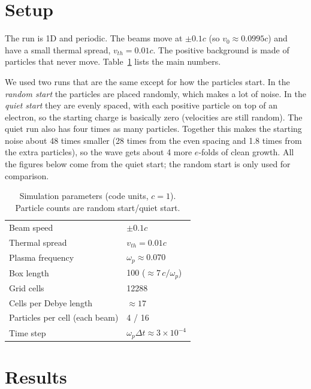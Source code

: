 \documentclass[10pt,twocolumn,letterpaper]{article}
\newcommand{\wpe}{\omega_{p}}   %
\newcommand{\vz}{v_0}           %
\begin{document}
\section{Setup}

The run is 1D and periodic. The beams move at $\pm0.1c$ (so $\vz\approx0.0995c$) and have a small
thermal spread, $v_{th}=0.01c$. The positive background is made of particles that never move.
Table~\ref{tab:params} lists the main numbers.

We used two runs that are the same except for how the particles start. In the \emph{random
start} the particles are placed randomly, which makes a lot of noise. In the \emph{quiet start}
they are evenly spaced, with each positive particle on top of an electron, so the starting charge
is basically zero (velocities are still random). The quiet run also has four times as many
particles. Together this makes the starting noise about 48 times smaller (28 times from the even
spacing and 1.8 times from the extra particles), so the wave gets about 4 more $e$-folds of clean
growth. All the figures below come from the quiet start; the random start is only used for
comparison.

\begin{table}[t]
  \centering
  \caption{Simulation parameters (code units, $c=1$). Particle counts are random start/quiet
  start.}
  \label{tab:params}
  \small
  \begin{tabular}{@{}ll@{}}
    \toprule
    Beam speed            & $\pm0.1c$ \\
    Thermal spread        & $v_{th}=0.01c$ \\
    Plasma frequency      & $\wpe\approx0.070$ \\
    Box length            & 100 ($\approx7\,c/\wpe$) \\
    Grid cells            & 12288 \\
    Cells per Debye length & $\approx17$ \\
    Particles per cell (each beam) & 4 / 16 \\
    Time step             & $\wpe\Delta t\approx3\times10^{-4}$ \\
    \bottomrule
  \end{tabular}
\end{table}

\section{Results}
\end{document}
